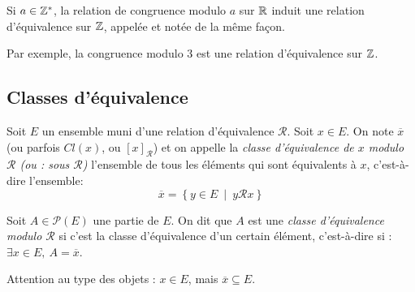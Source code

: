\begin{definition}
Si $a\in \mathbb{Z}^*$, la relation de congruence modulo $a$ sur $\mathbb{R}$ induit une relation d'équivalence sur $\mathbb{Z}$, appelée et notée de la même façon.
\end{definition}

Par exemple, la congruence modulo $3$ est une relation d'équivalence sur $\mathbb{Z}$.

\subsection{Classes d'équivalence}
\begin{definition}
Soit $E$ un ensemble muni d'une relation d'équivalence ${\mathcal R}$. Soit $x\in E$. On note $\overline{x}$ (ou parfois $Cl(x)$, ou $[x]_{\mathcal R}$) et on appelle la \emph{classe d'équivalence de $x$ modulo $\mathcal R$ (ou : sous $\mathcal R$)} l'ensemble  de tous les éléments qui sont équivalents à $x$, c'est-à-dire l'ensemble:
\[
\overline x = \left\{y\in E\:\mid\: y{\mathcal R}x\right\}
\]


Soit $A\in \mathcal P(E)$ une partie de $E$. On dit que $A$ est une \emph{classe d'équivalence modulo $\mathcal R$} si c'est la classe d'équivalence d'un certain élément, c'est-à-dire si : $\exists x\in E, \: A=\overline x$.
\end{definition}

Attention au type des objets : $x \in E$, mais $\overline{x} \subseteq E$.

